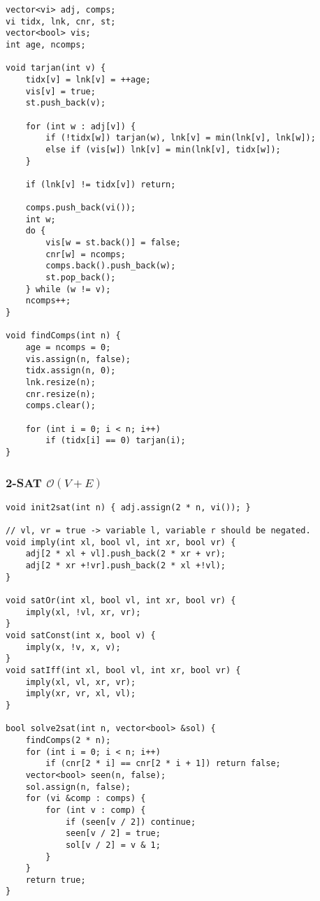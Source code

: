 \documentclass{article}
\begin{document}
\begin{lstlisting}
vector<vi> adj, comps;
vi tidx, lnk, cnr, st;
vector<bool> vis;
int age, ncomps;

void tarjan(int v) {
	tidx[v] = lnk[v] = ++age;
	vis[v] = true;
	st.push_back(v);

	for (int w : adj[v]) {
		if (!tidx[w]) tarjan(w), lnk[v] = min(lnk[v], lnk[w]);
		else if (vis[w]) lnk[v] = min(lnk[v], tidx[w]);
	}

	if (lnk[v] != tidx[v]) return;

	comps.push_back(vi());
	int w;
	do {
		vis[w = st.back()] = false;
		cnr[w] = ncomps;
		comps.back().push_back(w);
		st.pop_back();
	} while (w != v);
	ncomps++;
}

void findComps(int n) {
	age = ncomps = 0;
	vis.assign(n, false);
	tidx.assign(n, 0);
	lnk.resize(n);
	cnr.resize(n);
	comps.clear();

	for (int i = 0; i < n; i++)
		if (tidx[i] == 0) tarjan(i);
}
\end{lstlisting}

\subsubsection{2-SAT $\mathcal{O}(V+E)$}

\begin{lstlisting}
void init2sat(int n) { adj.assign(2 * n, vi()); }

// vl, vr = true -> variable l, variable r should be negated.
void imply(int xl, bool vl, int xr, bool vr) {
	adj[2 * xl + vl].push_back(2 * xr + vr);
	adj[2 * xr +!vr].push_back(2 * xl +!vl);
}

void satOr(int xl, bool vl, int xr, bool vr) {
	imply(xl, !vl, xr, vr);
}
void satConst(int x, bool v) {
	imply(x, !v, x, v);
}
void satIff(int xl, bool vl, int xr, bool vr) {
	imply(xl, vl, xr, vr);
	imply(xr, vr, xl, vl);
}

bool solve2sat(int n, vector<bool> &sol) {
	findComps(2 * n);
	for (int i = 0; i < n; i++)
		if (cnr[2 * i] == cnr[2 * i + 1]) return false;
	vector<bool> seen(n, false);
	sol.assign(n, false);
	for (vi &comp : comps) {
		for (int v : comp) {
			if (seen[v / 2]) continue;
			seen[v / 2] = true;
			sol[v / 2] = v & 1;
		}
	}
	return true;
}
\end{lstlisting}

\begin{comment}
\subsection{Cycle Detection $\mathcal{O}(V + E)$}

\begin{lstlisting}
vector<vi> adj; // assumes bidirected graph, adjust accordingly
vector<bool> vis(MAXN, false);
vector<int> par(MAXN, -1);

bool cycle_detection() {
	stack<int> s;
	s.push(0);
	vis[0] = true;
	while(!s.empty()) {
		int cur = s.top();
		s.pop();
		for(int i : adj[cur]) {
			if(vis[i] && par[cur] != i) return true;
			s.push(i);
			par[i] = cur;
			vis[i] = true;
		}
	}
	return false;
} 
\end{lstlisting}
\end{comment}
\end{document}

